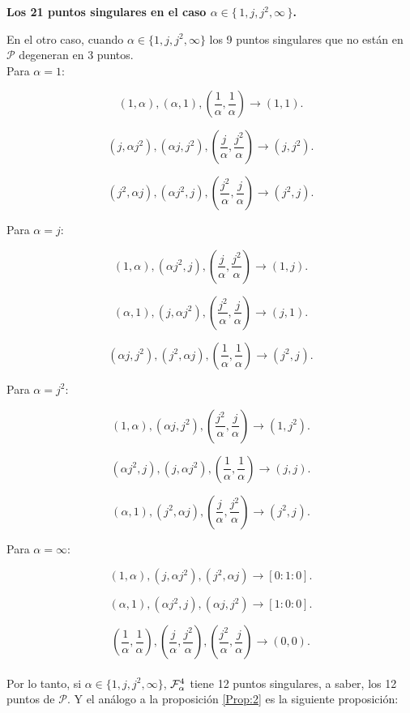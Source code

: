 \textbf{Los 21 puntos singulares en el caso $\alpha\in\{\, 1,j,j^{2},\infty \, \}$.}

En el otro caso, cuando $\alpha\in\{1,j,j^{2},\infty \}$ los 9 puntos singulares que no están en $\mathcal{P}$ degeneran en 3 puntos.
\\

Para $\alpha=1$:


$$(1,\alpha),(\alpha,1),(\frac{1}{\alpha},\frac{1}{\alpha}) \rightarrow (1,1).$$

$$(j,\alpha j^{2}),(\alpha j,j^{2}),(\frac{j}{\alpha},\frac{j^{2}}{\alpha}) \rightarrow (j,j^{2}).$$

$$(j^{2},\alpha j),(\alpha j^{2},j),(\frac{j^{2}}{\alpha},\frac{j}{\alpha}) \rightarrow (j^{2},j).$$


Para $\alpha=j$:


$$(1,\alpha),(\alpha j^{2},j),(\frac{j}{\alpha},\frac{j^{2}}{\alpha}) \rightarrow (1,j).$$

$$(\alpha,1),(j,\alpha j^{2}),(\frac{j^{2}}{\alpha},\frac{j}{\alpha}) \rightarrow (j,1).$$

$$(\alpha j,j^{2}),(j^{2},\alpha j),(\frac{1}{\alpha},\frac{1}{\alpha}) \rightarrow (j^{2},j^{}).$$


Para $\alpha=j^{2}$:


$$(1,\alpha),(\alpha j,j^{2}),(\frac{j^{2}}{\alpha},\frac{j}{\alpha}) \rightarrow (1,j^{2}).$$

$$(\alpha j^{2},j),(j,\alpha j^{2}),(\frac{1}{\alpha},\frac{1}{\alpha}) \rightarrow (j,j).$$

$$(\alpha ,1),(j^{2},\alpha j),(\frac{j}{\alpha},\frac{j^{2}}{\alpha}) \rightarrow (j^{2},j^{}).$$


Para $\alpha=\infty$:


$$(1,\alpha), (j,\alpha j^{2}),(j^{2}, \alpha j) \rightarrow [0:1:0].$$

$$(\alpha,1),(\alpha j^{2},j),(\alpha j, j^{2}) \rightarrow [1:0:0].$$

$$(\frac{1}{\alpha},\frac{1}{\alpha}),(\frac{j}{\alpha},\frac{j^{2}}{\alpha}),(\frac{j^{2}}{\alpha},\frac{j}{\alpha}) \rightarrow (0,0).$$
\\

Por lo tanto, si $\alpha\in\{1,j,j^{2},\infty \}$, $\Fol[4]{\alpha}$  tiene 12 puntos singulares, a saber, los 12 puntos de $\mathcal{P}$. Y el análogo a la proposición \ref{Prop:2} es la siguiente proposición:
\\

